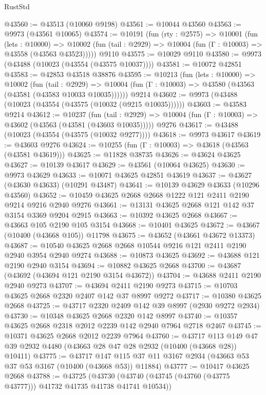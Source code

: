 \begin{lexlean}{RustStd}
\begin{coremodule}
@43560 := @43513 (@10060 @9198)
@43561 := @10044 @43560
@43563 := @9973 (@43561 @10065)
@43574 := @10191
    (fun (rty : @2575) =>
    @10001
      (fun (lets : @10000) =>
      @10002 (fun (tail : @2929) => @10004 (fun (Γ : @10003) => @43558 (@43563 @43523)))))
    @9110
@43575 := @10029 @9110
@43580 := @9973 (@43488 (@10023 (@43554 (@43575 @10037))))
@43581 := @10072 @42851
@43583 := @42853 @43518 @38876
@43595 := @10213
    (fun (lets : @10000) =>
    @10002
      (fun (tail : @2929) =>
      @10004 (fun (Γ : @10003) => @43580 (@43563 (@43581 (@43583 @10033 @10035))))))
    @9214
@43602 := @9973 (@43488 (@10023 (@43554 (@43575 (@10032 (@9215 @10035))))))
@43603 := @43583 @9214
@43612 := @10237
    (fun (tail : @2929) => @10004 (fun (Γ : @10003) => @43602 (@43563 (@43581 (@43603 @10035)))))
    @9276
@43617 := @43488 (@10023 (@43554 (@43575 (@10032 @9277))))
@43618 := @9973 @43617
@43619 := @43603 @9276
@43624 := @10255 (fun (Γ : @10003) => @43618 (@43563 (@43581 @43619)))
@43625 := @11828 @38735
@43626 := @43624 @43625
@43627 := @10139 @43617
@43629 := @43561 (@10064 @43625)
@43630 := @9973 @43629
@43633 := @10071 @43625 @42851 @43619
@43637 := @43627 (@43630 @43633) (@10291 @43487)
@43641 := @10139 @43629 @43633 (@10296 @43560)
@43652 := @10459 @43625 @2668 @2668 @1222 @121 @2411 @2190 @9214 @9216 @2940 @9276
@43661 := @13131 @43625 @2668 @121 @142 @37 @3154 @3369 @9204 @2915
@43663 := @10392 @43625 @2668
@43667 := @43663 @105 @2190 @105 @3154
@43668 := @10401 @43625
@43672 := @43667 (@10400 (@43668 @105)) @11798
@43675 := @43652 (@43661 @43672 @13373)
@43687 := @10540 @43625 @2668 @2668 @10544 @9216 @121 @2411 @2190 @2940 @3954 @2940 @9274
@43688 := @10873 @43625
@43692 := @43688 @121 @2190 @2940 @3154
@43694 := @10882 @43625 @2668
@43700 := @43687 (@43692 (@43694 @121 @2190 @3154 @43672))
@43704 := @43688 @2411 @2190 @2940 @9273
@43707 := @43694 @2411 @2190 @9273
@43715 := @10703 @43625 @2668 @2320 @2407 @142 @37 @8997 @9272
@43717 := @10380 @43625 @2668
@43725 := @43717 @2320 @2409 @142 @39 @8997 (@2930 @9272 @2934)
@43730 := @10348 @43625 @2668 @2320 @142 @8997
@43740 := @10357 @43625 @2668 @2318 @2012 @2239 @142 @2940 @7964 @2718 @2467
@43745 := @10371 @43625 @2668 @2012 @2239 @7964
@43760 := @43717
    @113
    @149
    @47
    @39
    @2932
    @4480
    (@43663 @28 @47 @28 @2932 (@10400 (@43668 @28)) @10411)
@43775 := @43717
    @147
    @115
    @37
    @11
    @3167
    @2934
    (@43663 @53 @37 @53 @3167 (@10400 (@43668 @53)) @11884)
@43777 := @10417 @43625 @2668
@43788 := @43725
    (@43730 (@43740 (@43745 (@43760 (@43775 @43777))) @41732 @41735 @41738 @41741 @10534))

\end{coremodule}
\end{lexlean}
